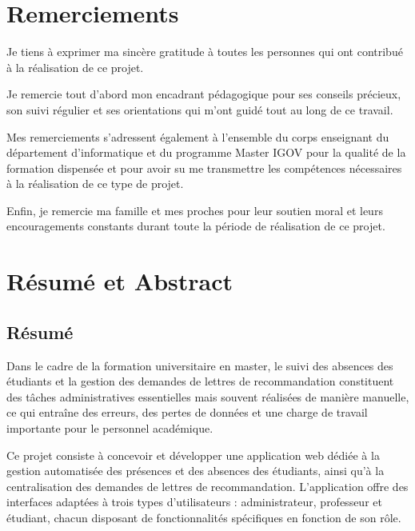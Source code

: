 \documentclass[12pt, a4paper, openright]{report}
\begin{document}
\hypersetup{pageanchor=true}

\cleardoublepage
\thispagestyle{empty}
\mbox{}

\cleardoublepage
{}
\setcounter{page}{1}
\thispagestyle{fancy}

\chapter*{Remerciements}
\thispagestyle{fancy}

Je tiens à exprimer ma sincère gratitude à toutes les personnes qui ont contribué à la réalisation de ce projet.

Je remercie tout d'abord mon encadrant pédagogique pour ses conseils précieux, son suivi régulier et ses orientations qui m'ont guidé tout au long de ce travail.

Mes remerciements s'adressent également à l'ensemble du corps enseignant du département d'informatique et du programme Master IGOV pour la qualité de la formation dispensée et pour avoir su me transmettre les compétences nécessaires à la réalisation de ce type de projet.

Enfin, je remercie ma famille et mes proches pour leur soutien moral et leurs encouragements constants durant toute la période de réalisation de ce projet.

\cleardoublepage
\chapter*{Résumé et Abstract}
\thispagestyle{fancy}

\section*{Résumé}
Dans le cadre de la formation universitaire en master, le suivi des absences des étudiants et la gestion des demandes de lettres de recommandation constituent des tâches administratives essentielles mais souvent réalisées de manière manuelle, ce qui entraîne des erreurs, des pertes de données et une charge de travail importante pour le personnel académique.

Ce projet consiste à concevoir et développer une application web dédiée à la gestion automatisée des présences et des absences des étudiants, ainsi qu'à la centralisation des demandes de lettres de recommandation. L'application offre des interfaces adaptées à trois types d'utilisateurs : administrateur, professeur et étudiant, chacun disposant de fonctionnalités spécifiques en fonction de son rôle.
\end{document}

